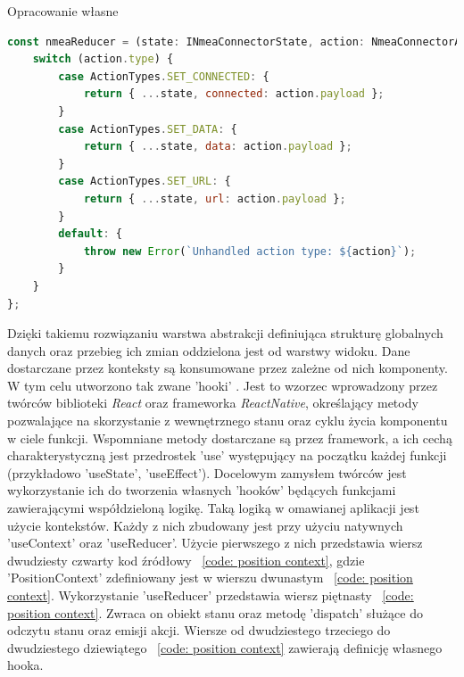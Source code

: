 \documentclass[skorowidz,skroty]{dyplomWEZUT}
\begin{document}
{Opracowanie własne}{\label{code: NMEA reducer}}
\begin{lstlisting}[language=JavaScript]
const nmeaReducer = (state: INmeaConnectorState, action: NmeaConnectorActions): INmeaConnectorState => {
    switch (action.type) {
        case ActionTypes.SET_CONNECTED: {
            return { ...state, connected: action.payload };
        }
        case ActionTypes.SET_DATA: {
            return { ...state, data: action.payload };
        }
        case ActionTypes.SET_URL: {
            return { ...state, url: action.payload };
        }
        default: {
            throw new Error(`Unhandled action type: ${action}`);
        }
    }
};
\end{lstlisting}

Dzięki takiemu rozwiązaniu warstwa abstrakcji definiująca strukturę globalnych danych oraz przebieg ich zmian oddzielona jest od warstwy widoku. Dane dostarczane przez konteksty są konsumowane przez zależne od nich komponenty. W tym celu utworzono tak zwane 'hooki' \cite{React}. Jest to wzorzec wprowadzony przez twórców biblioteki \textit{React} oraz frameworka \textit{ReactNative}, określający metody pozwalające na skorzystanie z wewnętrznego stanu oraz cyklu życia komponentu w ciele funkcji. Wspomniane metody dostarczane są przez framework, a ich cechą charakterystyczną jest przedrostek 'use' występujący na początku każdej funkcji (przykładowo 'useState', 'useEffect').  Docelowym zamysłem twórców jest wykorzystanie ich do tworzenia własnych 'hooków' będących funkcjami zawierającymi współdzieloną logikę. Taką logiką w omawianej aplikacji jest użycie kontekstów. Każdy z nich zbudowany jest przy użyciu natywnych  'useContext' oraz 'useReducer'. Użycie pierwszego z nich przedstawia wiersz dwudziesty czwarty  kod źródłowy ~\ref{code: position context}, gdzie 'PositionContext' zdefiniowany jest w wierszu dwunastym ~\ref{code: position context}. Wykorzystanie 'useReducer' przedstawia wiersz piętnasty ~\ref{code: position context}. Zwraca on obiekt stanu oraz metodę 'dispatch' służące do odczytu stanu oraz emisji akcji. Wiersze od dwudziestego trzeciego do dwudziestego dziewiątego ~\ref{code: position context} zawierają definicję własnego hooka.
   
\end{document}
